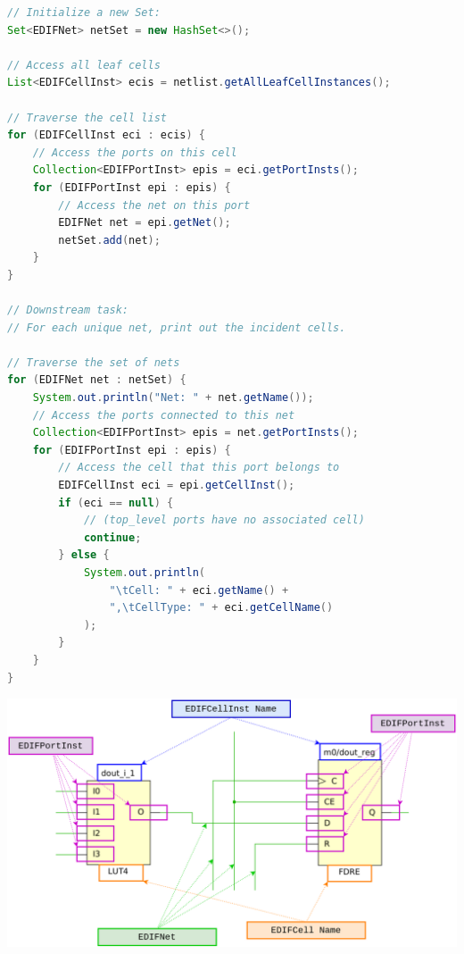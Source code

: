 \begin{multicols}{2}
\begin{lstlisting}[language=java, caption={Basic netlist extraction and traversal}, label={lst:netlist_extract}]
// Initialize a new Set:
Set<EDIFNet> netSet = new HashSet<>();

// Access all leaf cells
List<EDIFCellInst> ecis = netlist.getAllLeafCellInstances();

// Traverse the cell list
for (EDIFCellInst eci : ecis) {
    // Access the ports on this cell
    Collection<EDIFPortInst> epis = eci.getPortInsts();
    for (EDIFPortInst epi : epis) {
        // Access the net on this port
        EDIFNet net = epi.getNet();
        netSet.add(net);
    }
}

// Downstream task:
// For each unique net, print out the incident cells.

// Traverse the set of nets
for (EDIFNet net : netSet) {
    System.out.println("Net: " + net.getName());
    // Access the ports connected to this net
    Collection<EDIFPortInst> epis = net.getPortInsts();
    for (EDIFPortInst epi : epis) {
        // Access the cell that this port belongs to
        EDIFCellInst eci = epi.getCellInst();
        if (eci == null) {
            // (top_level ports have no associated cell)
            continue;
        } else {
            System.out.println(
                "\tCell: " + eci.getName() + 
                ",\tCellType: " + eci.getCellName()
            );
        }
    }
}
\end{lstlisting}

{
    \centering
    \includegraphics[valign=c, width=\columnwidth]{figures/traversal.png}
    \label{fig:traversal}
}
\vspace{0.5cm}


\end{multicols}
